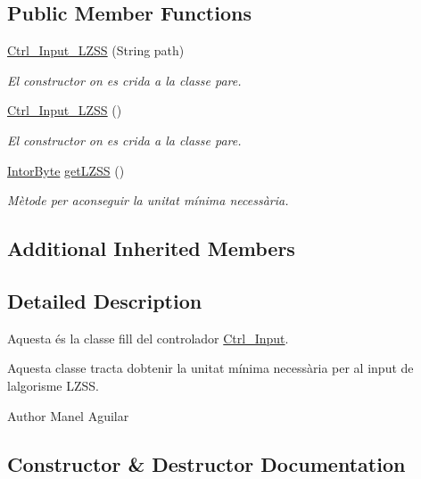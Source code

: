 \subsection*{Public Member Functions}
\begin{DoxyCompactItemize}
\item 
\hyperlink{classpersistencia_1_1input_1_1Ctrl__Input__LZSS_a00d5d178971cfd1d15604f97584368d5}{Ctrl\+\_\+\+Input\+\_\+\+L\+Z\+SS} (String path)
\begin{DoxyCompactList}\small\item\em El constructor on es crida a la classe pare. \end{DoxyCompactList}\item 
\hyperlink{classpersistencia_1_1input_1_1Ctrl__Input__LZSS_a5f83902014e0f60a116380a6e8724960}{Ctrl\+\_\+\+Input\+\_\+\+L\+Z\+SS} ()
\begin{DoxyCompactList}\small\item\em El constructor on es crida a la classe pare. \end{DoxyCompactList}\item 
\hyperlink{classdomini_1_1utils_1_1IntorByte}{Intor\+Byte} \hyperlink{classpersistencia_1_1input_1_1Ctrl__Input__LZSS_a204d4d68a1d94725d9017b71bac0288e}{get\+L\+Z\+SS} ()
\begin{DoxyCompactList}\small\item\em Mètode per aconseguir la unitat mínima necessària. \end{DoxyCompactList}\end{DoxyCompactItemize}
\subsection*{Additional Inherited Members}


\subsection{Detailed Description}
Aquesta és la classe fill del controlador \hyperlink{classpersistencia_1_1input_1_1Ctrl__Input}{Ctrl\+\_\+\+Input}. 

Aquesta classe tracta d\textquotesingle{}obtenir la unitat mínima necessària per al input de l\textquotesingle{}algorisme L\+Z\+SS.

\begin{DoxyAuthor}{Author}
Manel Aguilar 
\end{DoxyAuthor}


\subsection{Constructor \& Destructor Documentation}
\mbox{\label{classpersistencia_1_1input_1_1Ctrl__Input__LZSS_a00d5d178971cfd1d15604f97584368d5}} 
